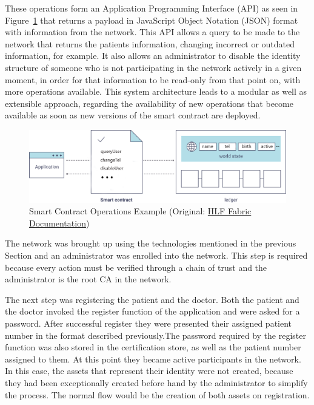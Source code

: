 These operations form an Application Programming Interface (API) as seen in
Figure~\ref{fig:smartContractOverview} that returns a payload in JavaScript
Object Notation (JSON) format with information from the network. This API
allows a query to be made to the network that returns the patients information,
changing incorrect or outdated information, for example. It also allows an
administrator to disable the identity structure of someone who is not
participating in the network actively in a given moment, in order for that
information to be read-only from that point on, with more operations available.
This system architecture leads to a modular as well as extensible approach,
regarding the availability of new operations that become available as soon as
new versions of the smart contract are deployed.  

\begin{figure}[ht] 
  \centering
  \includegraphics[width=0.9\linewidth]{imgs/smartContractOverview.png}
  \caption{\label{fig:smartContractOverview}Smart Contract Operations Example
  (Original:
  \href{http://hyperledger-fabric.readthedocs.io/en/latest/write_first_app.html}{HLF
  Fabric Documentation})} 
\end{figure}

The network was brought up using the technologies mentioned in the previous
Section and an administrator was enrolled into the network. This step is
required because every action must be verified through a chain of trust and the
administrator is the root CA in the network.

The next step was registering the patient and the doctor. Both the patient and
the doctor invoked the register function of the application and were asked for
a password. After successful register they were presented their assigned
patient number in the format described previously.The password required by the
register function was also stored in the certification store, as well as the
patient number assigned to them. At this point they became active participants
in the network. In this case, the assets that represent their identity were not
created, because they had been exceptionally created before hand by the
administrator to simplify the process. The normal flow would be the creation of
both assets on registration.

